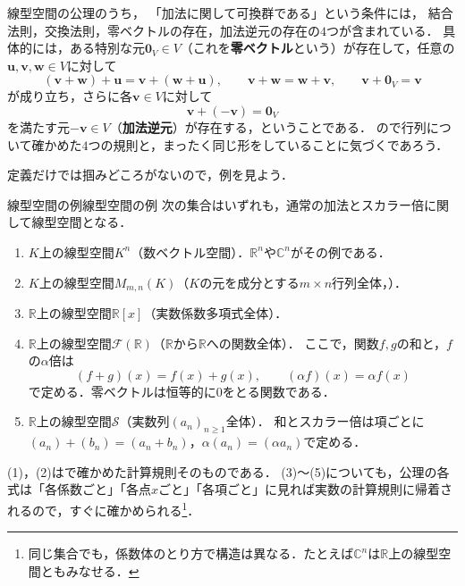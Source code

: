\begin{remark}[加法に関する可換群の条件]
線型空間の公理のうち，
「加法に関して可換群である」という条件には，
結合法則，交換法則，零ベクトルの存在，加法逆元の存在の$4$つが含まれている．
具体的には，ある特別な元$\bm{0}_V\in V$（これを\textbf{零ベクトル}という）が存在して，任意の$\bm{u},\bm{v},\bm{w}\in V$に対して
\[
  (\bm{v}+\bm{w})+\bm{u}
  =
  \bm{v}+(\bm{w}+\bm{u}),
  \qquad
  \bm{v}+\bm{w}
  =
  \bm{w}+\bm{v},
  \qquad
  \bm{v}+\bm{0}_V
  =
  \bm{v}
\]
が成り立ち，さらに各$\bm{v}\in V$に対して
\[
  \bm{v}+(-\bm{v})
  =
  \bm{0}_V
\]
を満たす元$-\bm{v}\in V$（\textbf{加法逆元}）が存在する，ということである．
ので行列について確かめた$4$つの規則と，まったく同じ形をしていることに気づくであろう．
\end{remark}

定義だけでは掴みどころがないので，例を見よう．

\begin{example}{線型空間の例}{線型空間の例}
次の集合はいずれも，通常の加法とスカラー倍に関して線型空間となる．
\begin{enumerate}[label=(\arabic*),leftmargin=3.2em]
\item $K$上の線型空間$K^n$（数ベクトル空間）．$\mathbb{R}^n$や$\mathbb{C}^n$がその例である．
\item $K$上の線型空間$M_{m,n}(K)$（$K$の元を成分とする$m\times n$行列全体，）．
\item $\mathbb{R}$上の線型空間$\mathbb{R}[x]$（実数係数多項式全体）．
\item $\mathbb{R}$上の線型空間$\mathcal{F}(\mathbb{R})$（$\mathbb{R}$から$\mathbb{R}$への関数全体）．
  ここで，関数$f,g$の和と，$f$の$\alpha$倍は
  \[
    (f+g)(x)=f(x)+g(x),
    \qquad
    (\alpha f)(x)=\alpha f(x)
  \]
  で定める．零ベクトルは恒等的に$0$をとる関数である．
\item $\mathbb{R}$上の線型空間$\mathcal{S}$（実数列$(a_n)_{n\ge1}$全体）．
  和とスカラー倍は項ごとに$(a_n)+(b_n)=(a_n+b_n)$，$\alpha(a_n)=(\alpha a_n)$で定める．
\end{enumerate}
(1)，(2)はで確かめた計算規則そのものである．
(3)〜(5)についても，公理の各式は「各係数ごと」「各点$x$ごと」「各項ごと」に見れば実数の計算規則に帰着されるので，すぐに確かめられる\footnote{同じ集合でも，係数体のとり方で構造は異なる．たとえば$\mathbb{C}^n$は$\mathbb{R}$上の線型空間ともみなせる．}．
\end{example}

